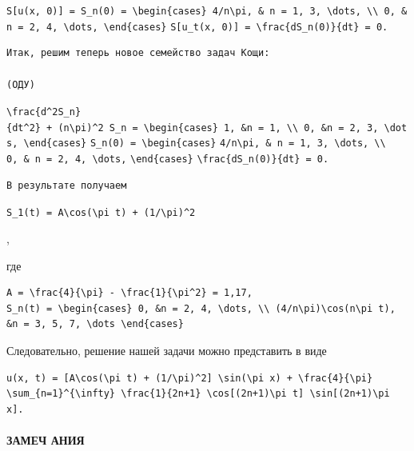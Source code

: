 \documentclass[
  ukrainian,
]{article}
\begin{document}
\texttt{S{[}u(x,\ 0){]}\ =\ S\_n(0)\ =\ \textbackslash{}begin\{cases\}\ 4/n\textbackslash{}pi,\ \&\ n\ =\ 1,\ 3,\ \textbackslash{}dots,\ \textbackslash{}\textbackslash{}\ 0,\ \&n\ =\ 2,\ 4,\ \textbackslash{}dots,\ \textbackslash{}end\{cases\}}
\texttt{S{[}u\_t(x,\ 0){]}\ =\ \textbackslash{}frac\{dS\_n(0)\}\{dt\}\ =\ 0.}

\begin{verbatim}
Итак, решим теперь новое семейство задач Кощи:

(ОДУ)
\end{verbatim}

\texttt{\textbackslash{}frac\{d\^{}2S\_n\}\{dt\^{}2\}\ +\ (n\textbackslash{}pi)\^{}2\ S\_n\ =\ \textbackslash{}begin\{cases\}\ 1,\ \&n\ =\ 1,\ \textbackslash{}\textbackslash{}\ 0,\ \&n\ =\ 2,\ 3,\ \textbackslash{}dots,\ \textbackslash{}end\{cases\}}
\texttt{S\_n(0)\ =\ \textbackslash{}begin\{cases\}}
\texttt{4/n\textbackslash{}pi,\ \&\ n\ =\ 1,\ 3,\ \textbackslash{}dots,\ \textbackslash{}\textbackslash{}}
\texttt{0,\ \&\ n\ =\ 2,\ 4,\ \textbackslash{}dots,}
\texttt{\textbackslash{}end\{cases\}}
\texttt{\textbackslash{}frac\{dS\_n(0)\}\{dt\}\ =\ 0.}

\begin{verbatim}
В результате получаем
\end{verbatim}

\texttt{S\_1(t)\ =\ A\textbackslash{}cos(\textbackslash{}pi\ t)\ +\ (1/\textbackslash{}pi)\^{}2}

,

где

\begin{verbatim}
A = \frac{4}{\pi} - \frac{1}{\pi^2} = 1,17,
S_n(t) = \begin{cases} 0, &n = 2, 4, \dots, \\ (4/n\pi)\cos(n\pi t), &n = 3, 5, 7, \dots \end{cases}
\end{verbatim}

Следовательно, решение нашей задачи можно представить в виде

\begin{verbatim}
u(x, t) = [A\cos(\pi t) + (1/\pi)^2] \sin(\pi x) + \frac{4}{\pi} \sum_{n=1}^{\infty} \frac{1}{2n+1} \cos[(2n+1)\pi t] \sin[(2n+1)\pi x].
\end{verbatim}

\paragraph{ЗАМЕЧ
АНИЯ}\label{ux437ux430ux43cux435ux447-ux430ux43dux438ux44f}
\end{document}

